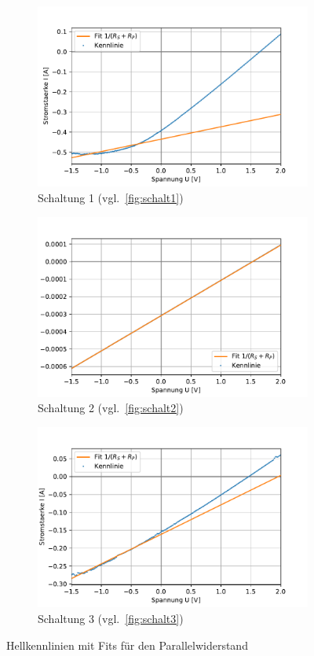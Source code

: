 \documentclass[slug=SZ, room=Hermann-Krone-Bau\,\ Labor\ 1.25, supervisor=Martin\ Kroll]{../../Lab_Report_LaTeX/lab_report}
\begin{document}
\begin{figure}[H]\centering
        \begin{subfigure}[b]{1\textwidth}\centering
                \includegraphics[width=.5\columnwidth]{figs/python/3x3_schaltung_2_rsrp.pdf}
                \caption{Schaltung 1 (vgl.~\ref{fig:schalt1})}
                \label{diag:hellschalt1fit}
        \end{subfigure}
        \begin{subfigure}[b]{1\textwidth}\centering
                \includegraphics[width=.5\columnwidth]{figs/python/3x3_schaltung_3_rsrp.pdf}
                \caption{Schaltung 2 (vgl.~\ref{fig:schalt2})}
                \label{diag:hellschalt2fit}
        \end{subfigure}
        \begin{subfigure}[b]{1\textwidth}\centering
                \includegraphics[width=.5\columnwidth]{figs/python/3x3_schaltung_4_rsrp.pdf}
                \caption{Schaltung 3 (vgl.~\ref{fig:schalt3})}
                \label{diag:hellschalt3fit}
        \end{subfigure}
        \caption{Hellkennlinien mit Fits f\"ur den Parallelwiderstand}
        \label{fig:hellkennfit}
\end{figure}
\end{document}
